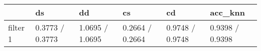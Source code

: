 \begin{tabular}{llllll}
\toprule
{} &               ds &               dd &               cs &               cd &          acc\_knn \\
\midrule
filter 1 &  0.3773 / 0.3773 &  1.0695 / 1.0695 &  0.2664 / 0.2664 &  0.9748 / 0.9748 &  0.9398 / 0.9398 \\
\bottomrule
\end{tabular}
